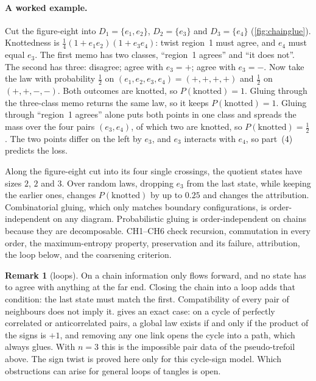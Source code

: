 \documentclass[11pt]{article}
\theoremstyle{definition}\newtheorem{definition}[theorem]{Definition}\newtheorem{remark}[theorem]{Remark}\newtheorem{example}[theorem]{Example}\newtheorem{problem}[theorem]{Open problem}\crefname{problem}{Problem}{Problems}
\begin{document}
\paragraph{A worked example.} Cut the figure-eight into $D_1=\{e_1,e_2\}$, $D_2=\{e_3\}$ and $D_3=\{e_4\}$ (\cref{fig:chainglue}). Knottedness is $\tfrac14(1+e_1e_2)(1+e_3e_4)$: twist region~1 must agree, and $e_4$ must equal $e_3$. The first memo has two classes, ``region~1 agrees'' and ``it does not''. The second has three: disagree; agree with $e_3=+$; agree with $e_3=-$. Now take the law with probability $\tfrac12$ on $(e_1,e_2,e_3,e_4)=(+,+,+,+)$ and $\tfrac12$ on $(+,+,-,-)$. Both outcomes are knotted, so $P(\text{knotted})=1$. Gluing through the three-class memo returns the same law, so it keeps $P(\text{knotted})=1$. Gluing through ``region~1 agrees'' alone puts both points in one class and spreads the mass over the four pairs $(e_3,e_4)$, of which two are knotted, so $P(\text{knotted})=\tfrac12$. The two points differ on the left by $e_3$, and $e_3$ interacts with $e_4$, so part~(4) predicts the loss.

Along the figure-eight cut into its four single crossings, the quotient states have sizes $2$, $2$ and $3$. Over random laws, dropping $e_3$ from the last state, while keeping the earlier ones, changes $P(\text{knotted})$ by up to $0.25$ and changes the attribution. Combinatorial gluing, which only matches boundary configurations, is order-independent on any diagram. Probabilistic gluing is order-independent on chains because they are decomposable. CH1--CH6 check recursion, commutation in every order, the maximum-entropy property, preservation and its failure, attribution, the loop below, and the coarsening criterion.

\begin{remark}[loops]\label{rem:chainloop}
On a chain information only flows forward, and no state has to agree with anything at the far end. Closing the chain into a loop adds that condition: the last state must match the first. Compatibility of every pair of neighbours does not imply it.  gives an exact case: on a cycle of perfectly correlated or anticorrelated pairs, a global law exists if and only if the product of the signs is $+1$, and removing any one link opens the cycle into a path, which always glues. With $n=3$ this is the impossible pair data of the pseudo-trefoil above. The sign twist is proved here only for this cycle-sign model. Which obstructions can arise for general loops of tangles is open.
\end{remark}
\end{document}

